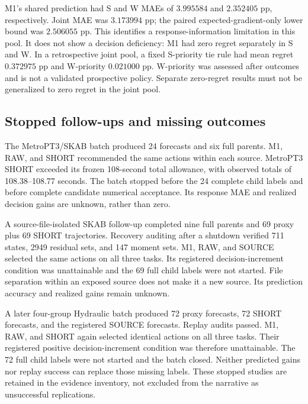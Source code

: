 \documentclass[11pt]{article}
\begin{document}
M1's shared prediction had S and W MAEs of $3.995584$ and $2.352405$ pp, respectively. Joint MAE was $3.173994$ pp; the paired expected-gradient-only lower bound was $2.506055$ pp. This identifies a response-information limitation in this pool. It does not show a decision deficiency: M1 had zero regret separately in S and W. In a retrospective joint pool, a fixed S-priority tie rule had mean regret $0.372975$ pp and W-priority $0.021000$ pp. W-priority was assessed after outcomes and is not a validated prospective policy. Separate zero-regret results must not be generalized to zero regret in the joint pool.

\subsection{Stopped follow-ups and missing outcomes}
The MetroPT3/SKAB batch produced 24 forecasts and six full parents. M1, RAW, and SHORT recommended the same actions within each source. MetroPT3 SHORT exceeded its frozen 108-second total allowance, with observed totals of 108.38--108.77 seconds. The batch stopped before the 24 complete child labels and before complete candidate numerical acceptance. Its response MAE and realized decision gains are unknown, rather than zero.

A source-file-isolated SKAB follow-up completed nine full parents and 69 proxy plus 69 SHORT trajectories. Recovery auditing after a shutdown verified 711 states, 2949 residual sets, and 147 moment sets. M1, RAW, and SOURCE selected the same actions on all three tasks. Its registered decision-increment condition was unattainable and the 69 full child labels were not started. File separation within an exposed source does not make it a new source. Its prediction accuracy and realized gains remain unknown.

A later four-group Hydraulic batch produced 72 proxy forecasts, 72 SHORT forecasts, and the registered SOURCE forecasts. Replay audits passed. M1, RAW, and SHORT again selected identical actions on all three tasks. Their registered positive decision-increment condition was therefore unattainable. The 72 full child labels were not started and the batch closed. Neither predicted gains nor replay success can replace those missing labels. These stopped studies are retained in the evidence inventory, not excluded from the narrative as unsuccessful replications.
\end{document}
